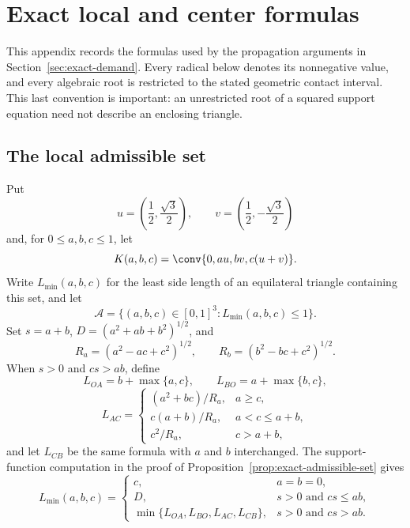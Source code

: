 \section{Exact local and center formulas}
\label{app:formulas}

This appendix records the formulas used by the propagation arguments in
Section~\ref{sec:exact-demand}.  Every radical below denotes its nonnegative
value, and every algebraic root is restricted to the stated geometric
contact interval.  This last convention is important: an unrestricted root
of a squared support equation need not describe an enclosing triangle.

\subsection{The local admissible set}

Put
\[
 u=\left(\frac12,\frac{\sqrt3}{2}\right),\qquad
 v=\left(\frac12,-\frac{\sqrt3}{2}\right)
\]
and, for $0\le a,b,c\le1$, let
\[
 K(a,b,c)=\conv\{0,au,bv,c(u+v)\}.
\]
Write $L_{\min}(a,b,c)$ for the least side length of an equilateral
triangle containing this set, and let
\[
 \mathcal A=\{(a,b,c)\in[0,1]^3:L_{\min}(a,b,c)\le1\}.
\]
Set $s=a+b$, $D=(a^2+ab+b^2)^{1/2}$, and
\[
 R_a=(a^2-ac+c^2)^{1/2},\qquad
 R_b=(b^2-bc+c^2)^{1/2}.
\]
When $s>0$ and $cs>ab$, define
\[
 L_{OA}=b+\max\{a,c\},\qquad
 L_{BO}=a+\max\{b,c\},
\]
\[
 L_{AC}=
 \begin{cases}
 (a^2+bc)/R_a,&a\ge c,\\
 c(a+b)/R_a,&a<c\le a+b,\\
 c^2/R_a,&c>a+b,
 \end{cases}
\]
and let $L_{CB}$ be the same formula with $a$ and $b$ interchanged.
The support-function computation in the proof of
Proposition~\ref{prop:exact-admissible-set} gives
\begin{equation}
 L_{\min}(a,b,c)=
 \begin{cases}
 c,&a=b=0,\\
 D,&s>0\text{ and }cs\le ab,\\
 \min\{L_{OA},L_{BO},L_{AC},L_{CB}\},
     &s>0\text{ and }cs>ab.
 \end{cases}
 \label{eq:Lmin-support-formula}
\end{equation}

